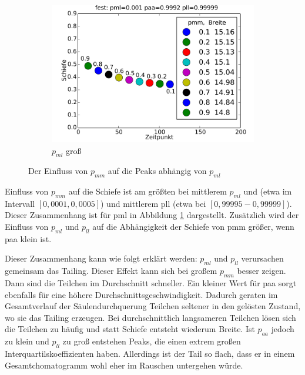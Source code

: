 \begin{figure}[H]
\begin{subfigure}{0.6\textwidth}
\includegraphics[width=\textwidth]{bilder/pmm/3fest_p_0001_09992_099999}
\caption{$p_{ml}$ groß}
\end{subfigure}
\caption{Der Einfluss von $p_{mm}$ auf die Peaks abhängig von $p_{ml}$}
\label{einfluss_pmm_2}
\end{figure}

Einfluss von $p_{mm}$ auf die Schiefe ist am größten bei mittlerem $p_{ml}$ und (etwa im Intervall $[0,0001, 0,0005]$) und mittlerem pll (etwa bei $[0,99995-0,99999]$). Dieser Zusammenhang ist für pml in Abbildung \ref{einfluss_pmm_2} dargestellt.
Zusätzlich wird der Einfluss von $p_{ml}$ und $p_{ll}$ auf die Abhängigkeit der Schiefe von pmm größer, wenn paa klein ist.

Dieser Zusammenhang kann wie folgt erklärt werden: $p_{ml}$ und $p_{ll}$ verursachen gemeinsam das Tailing. Dieser Effekt kann sich bei großem $p_{mm}$ besser zeigen. Dann sind die Teilchen im Durchschnitt schneller. Ein kleiner Wert für paa sorgt ebenfalls für eine höhere Durchschnittsgeschwindigkeit. Dadurch geraten im Gesamtverlauf der Säulendurchquerung Teilchen seltener in den gelösten Zustand, wo sie das Tailing erzeugen. Bei durchschnittlich langsameren Teilchen lösen sich die Teilchen zu häufig und statt Schiefe entsteht wiederum Breite.
Ist $p_{aa}$ jedoch zu klein und $p_{ll}$ zu groß entstehen Peaks, die einen extrem großen Interquartilskoeffizienten haben. Allerdings ist der Tail so flach, dass er in einem Gesamtchomatogramm wohl eher im Rauschen untergehen würde.



